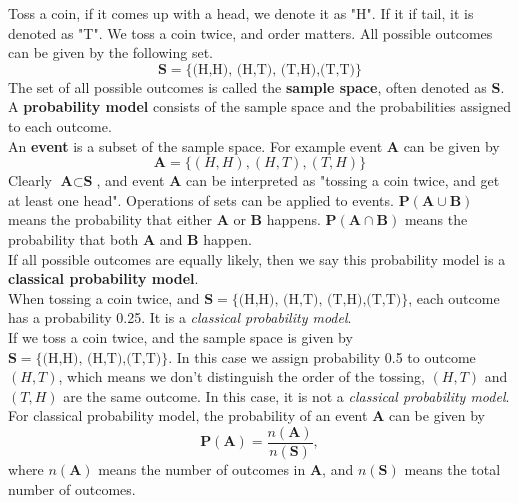 \documentclass[a4paper, 12pt,twoside]{book}
\begin{document}
Toss a coin, if it comes up with a head, we denote it as "H". If it if tail, it is denoted as "T". We toss a coin twice, and order matters. All possible outcomes can be given by the following set.
$$\textbf{S} = \{\text{(H,H), (H,T), (T,H),(T,T)}\}$$
The set of all possible outcomes is called the \textbf{sample space}, often denoted as \textbf{S}.
A \textbf{probability model} consists of the sample space and the probabilities assigned to each outcome.
\vspace{0.6cm}\\
An \textbf{event} is a subset of the sample space. For example event \textbf{A} can be given by 
         $$\textbf{A} = \{(H,H),(H,T), (T,H)\} $$
 Clearly $\textbf{A} \subset \textbf{S}$, and event \textbf{A} can be interpreted as "tossing a coin twice, and get at least one head". Operations of sets can be applied to events. $\textbf{P}(\textbf{A}\cup \textbf{B})$  means the probability that either \textbf{A}  or \textbf{B} happens. $\textbf{P}(\textbf{A}\cap \textbf{B})$  means the probability that both \textbf{A}  and \textbf{B} happen. 
    \vspace{0.6cm}\\    
 If all possible outcomes are equally likely, then we say this probability model is a \textbf{classical probability model}.
 \vspace{0.6cm}\\ 
When tossing a coin twice, and $\textbf{S} = \{\text{(H,H), (H,T), (T,H),(T,T)}\}$, each outcome has a probability 0.25. It is a \textit{classical probability model}.
\vspace{0.6cm}\\
If we toss a coin twice, and the sample space is given by $\textbf{S} = \{\text{(H,H), (H,T),(T,T)}\}$. In this case we assign probability 0.5 to outcome $(H,T)$, which means we don't distinguish the order of the tossing, $(H,T)$ and $(T,H)$ are the same outcome. In this case, it is not a \textit{classical probability model}.
\vspace{0.6cm}\\
For classical probability model, the probability of an event \textbf{A} can be given by 
    $$\textbf{P}(\textbf{A}) = \frac{n(\textbf{A})}{n(\textbf{S})},$$
    where $n(\textbf{A})$ means the number of outcomes in \textbf{A}, and $n(\textbf{S})$  means the total number of outcomes.
    \vspace{0.6cm}\\
    
\end{document}
